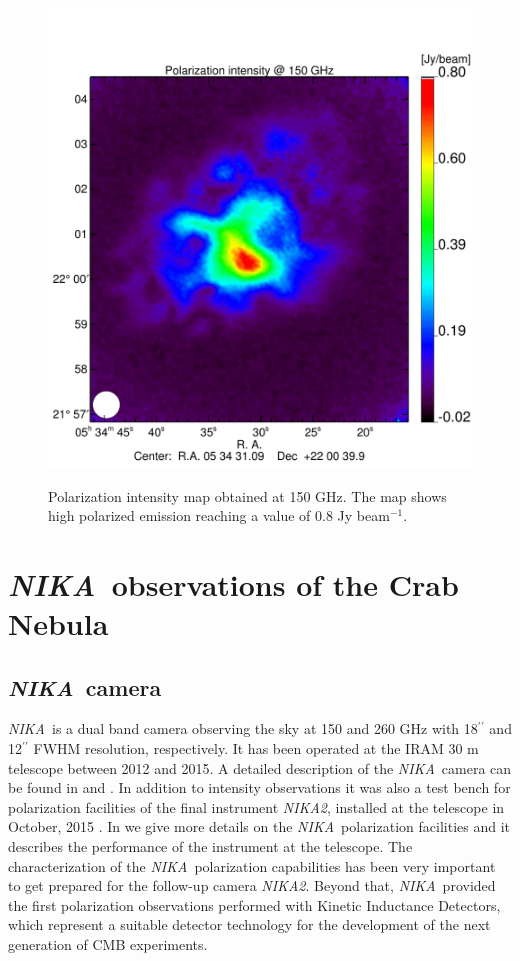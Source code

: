 \documentclass[twocolumn,traditabstract]{aa}
\def\NIKA{\textit{NIKA}}
\def\NIKAd{\textit{NIKA2}}
\begin{document}
 \begin{figure}
  \centering
     	   {\includegraphics[width=0.75\linewidth,keepaspectratio]{figures/Crab_ipol2_2mm.pdf}}
\caption{Polarization intensity map obtained at 150 GHz. The map shows high polarized emission reaching a value of 0.8 Jy beam$^{-1}$.}
\label{crab_ipol_maps}		
  \end{figure}
 

\section{\NIKA\ observations of the Crab Nebula}\label{sec:NIKA observations}
\subsection{\NIKA\ camera}\label{sec:nika camera}
\NIKA\ is a dual band camera observing the sky at 150 and 260 GHz with 18$^{\prime\prime}$ and 12$^{\prime\prime}$ FWHM resolution, respectively. It has been operated at the IRAM 30 m telescope between 2012 and 2015. A detailed description of the \NIKA\ camera can be found in \citet{monfardini2010, monfardini2011} and \citet{catalano2014}. In addition to intensity observations it was also a test bench for polarization facilities of the final instrument \NIKAd, installed at the telescope in October, 2015 \citep{calvo2016,2016arXiv160508628C}.
 In \cite{ritacco2017} we give more details on the \NIKA\ polarization facilities and it describes the performance of the instrument at the telescope. The characterization of the \NIKA\ polarization capabilities has been very important to get prepared for the follow-up camera \NIKAd. Beyond that, \NIKA\ provided the first polarization observations performed with Kinetic Inductance Detectors, which represent a suitable detector technology for the development of the next generation of CMB experiments.
\end{document}

